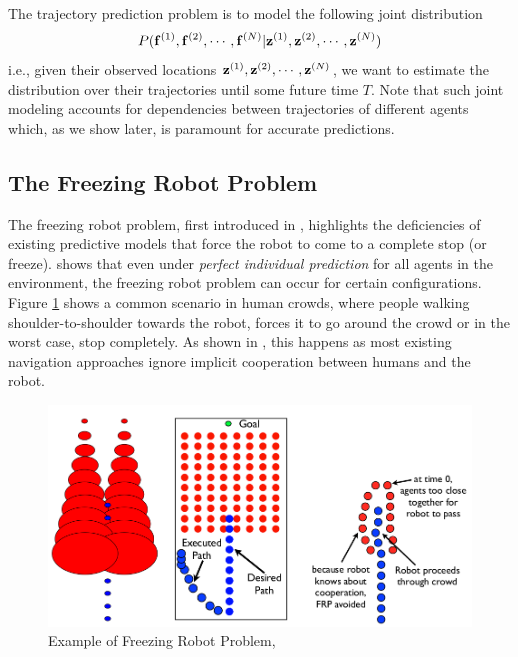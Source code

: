 The trajectory prediction problem is to model the following joint distribution
\begin{equation}
  \label{eq:traj-prediction-problem}
  P(\mathbf{f}^{(1)}, \mathbf{f}^{(2)}, \cdots, \mathbf{f}^{(N)} | \mathbf{z}^{(1)}, \mathbf{z}^{(2)}, \cdots, \mathbf{z}^{(N)})
\end{equation}
i.e., given their observed locations $\mathbf{z}^{(1)}, \mathbf{z}^{(2)}, \cdots, \mathbf{z}^{(N)}$, we want to estimate the distribution over their trajectories until some future time $T$. Note that such joint modeling accounts for dependencies between trajectories of different agents which, as we show later, is paramount for accurate predictions.

\subsection{The Freezing Robot Problem}
\label{sec:intro-plann-as-infer}

The freezing robot problem, first introduced in \cite{trautman10}, highlights the deficiencies of existing predictive models that force the robot to come to a complete stop (or freeze). \cite{trautman10} shows that even under \textit{perfect individual prediction} for all agents in the environment, the freezing robot problem can occur for certain configurations. Figure \ref{fig:intro-freeze} shows a common scenario in human crowds, where people walking shoulder-to-shoulder towards the robot, forces it to go around the crowd or in the worst case, stop completely.
As shown in \cite{trautman10}, this happens as most existing navigation approaches ignore implicit cooperation between humans and the robot. 

\begin{figure}
  \centering
  \includegraphics[width=\linewidth]{Figures/frp.png}
  \caption{Example of Freezing Robot Problem, \cite{trautman10}}
  \label{fig:intro-freeze}
\end{figure}

